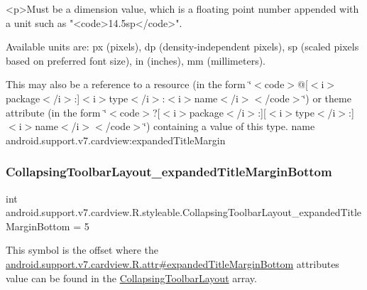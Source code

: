 \begin{DoxyVerb}      <p>Must be a dimension value, which is a floating point number appended with a unit such as "<code>14.5sp</code>".
\end{DoxyVerb}
 Available units are\+: px (pixels), dp (density-\/independent pixels), sp (scaled pixels based on preferred font size), in (inches), mm (millimeters). 

This may also be a reference to a resource (in the form \char`\"{}$<$code$>$@\mbox{[}$<$i$>$package$<$/i$>$\+:\mbox{]}$<$i$>$type$<$/i$>$\+:$<$i$>$name$<$/i$>$$<$/code$>$\char`\"{}) or theme attribute (in the form \char`\"{}$<$code$>$?\mbox{[}$<$i$>$package$<$/i$>$\+:\mbox{]}\mbox{[}$<$i$>$type$<$/i$>$\+:\mbox{]}$<$i$>$name$<$/i$>$$<$/code$>$\char`\"{}) containing a value of this type.  name android.\+support.\+v7.\+cardview\+:expanded\+Title\+Margin \mbox{\label{classandroid_1_1support_1_1v7_1_1cardview_1_1R_1_1styleable_ad9b7a75fc3bd07996d8b38480cb5e7a2}} 
\subsubsection{\texorpdfstring{Collapsing\+Toolbar\+Layout\+\_\+expanded\+Title\+Margin\+Bottom}{CollapsingToolbarLayout\_expandedTitleMarginBottom}}
{\footnotesize\ttfamily int android.\+support.\+v7.\+cardview.\+R.\+styleable.\+Collapsing\+Toolbar\+Layout\+\_\+expanded\+Title\+Margin\+Bottom = 5\hspace{0.3cm}{\ttfamily [static]}}

This symbol is the offset where the \hyperlink{classandroid_1_1support_1_1v7_1_1cardview_1_1R_1_1attr_a878bd32d2efa5f44c68c548991a7680b}{android.\+support.\+v7.\+cardview.\+R.\+attr\#expanded\+Title\+Margin\+Bottom} attribute\textquotesingle{}s value can be found in the \hyperlink{classandroid_1_1support_1_1v7_1_1cardview_1_1R_1_1styleable_a3b4c5393d0c99cb4e5a7a3911fc606b4}{Collapsing\+Toolbar\+Layout} array.

